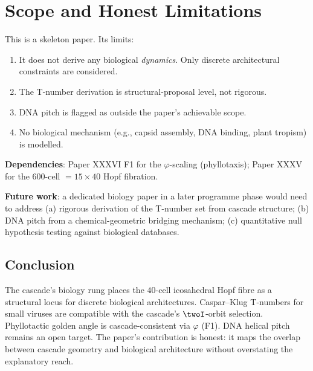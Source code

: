 \documentclass[12pt]{article}
\theoremstyle{definition}
\theoremstyle{remark}
\begin{document}
\section{Scope and Honest Limitations}\label{sec:scope}

This is a skeleton paper. Its limits:
\begin{enumerate}
\item It does not derive any biological \emph{dynamics}. Only discrete architectural constraints are considered.
\item The T-number derivation is structural-proposal level, not rigorous.
\item DNA pitch is flagged as outside the paper's achievable scope.
\item No biological mechanism (e.g., capsid assembly, DNA binding, plant tropism) is modelled.
\end{enumerate}

\textbf{Dependencies}: Paper XXXVI F1 for the $\varphi$-scaling (phyllotaxis); Paper XXXV for the 600-cell $= 15 \times 40$ Hopf fibration.

\textbf{Future work}: a dedicated biology paper in a later programme phase would need to address (a) rigorous derivation of the T-number set from cascade structure; (b) DNA pitch from a chemical-geometric bridging mechanism; (c) quantitative null hypothesis testing against biological databases.

\subsection{Conclusion}

The cascade's biology rung places the $40$-cell icosahedral Hopf fibre as a structural locus for discrete biological architectures. Caspar--Klug T-numbers for small viruses are compatible with the cascade's $\twoI$-orbit selection. Phyllotactic golden angle is cascade-consistent via $\varphi$ (F1). DNA helical pitch remains an open target. The paper's contribution is honest: it maps the overlap between cascade geometry and biological architecture without overstating the explanatory reach.
\end{document}

